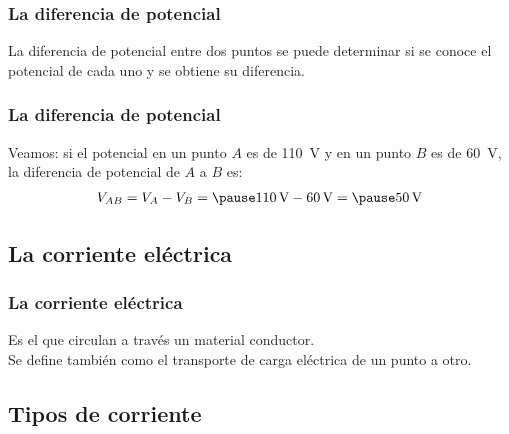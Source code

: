 \documentclass[14pt]{beamer}
\begin{document}
\begin{frame}
\frametitle{La diferencia de potencial}
La diferencia de potencial entre dos puntos se puede determinar si se conoce el potencial de cada uno y se obtiene su diferencia.
\end{frame}
\begin{frame}
\frametitle{La diferencia de potencial}    
Veamos: si el potencial en un punto $A$ es de \SI{110}{\volt} \pause y en un punto $B$ es de \SI{60}{\volt}, \pause la diferencia de potencial de $A$ a $B$ es:
\pause
\begin{eqnarray*}
\begin{aligned}
V_{AB} = V_{A} - V_{B} = \pause \SI{110}{\volt} - \SI{60}{\volt} = \pause \SI{50}{\volt}
\end{aligned}
\end{eqnarray*}
\end{frame}

\subsection{La corriente eléctrica}

\begin{frame}
\frametitle{La corriente eléctrica}
Es el  que circulan a través un material conductor.
\\
\bigskip
\pause
Se define también como el transporte de carga eléctrica de un punto a otro.
\end{frame}

\subsection{Tipos de corriente}
\end{document}
